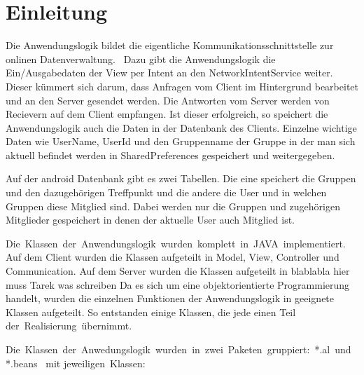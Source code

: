 \section{Einleitung}

Die Anwendungslogik bildet die eigentliche Kommunikationsschnittstelle zur onlinen
Datenverwaltung. 
Dazu gibt die Anwendungslogik die Ein­/Ausgabedaten der View per Intent
an den NetworkIntentService weiter. Dieser kümmert sich darum, dass Anfragen vom Client
im Hintergrund bearbeitet und an den Server gesendet werden. Die Antworten vom Server
werden von Recievern auf dem Client empfangen. Ist dieser erfolgreich,
so speichert die Anwendungslogik auch die Daten in der Datenbank des Clients. Einzelne wichtige
Daten wie UserName, UserId und den Gruppenname der Gruppe in der man sich aktuell befindet werden
in SharedPreferences gespeichert und weitergegeben.

Auf der android Datenbank gibt es zwei Tabellen. Die eine speichert die Gruppen und den dazugehörigen
Treffpunkt und die andere die User und in welchen Gruppen diese Mitglied sind. Dabei werden nur die
Gruppen und zugehörigen Mitglieder gespeichert in denen der aktuelle User auch Mitglied ist.

Die Klassen der Anwendungslogik wurden komplett in JAVA implementiert.
Auf dem Client wurden die Klassen aufgeteilt in Model, View, Controller und Communication.
Auf dem Server wurden die Klassen aufgeteilt in blablabla hier muss Tarek was schreiben
Da es sich um eine objektorientierte Programmierung handelt, wurden die einzelnen Funktionen der
Anwendungslogik in geeignete Klassen aufgeteilt. So entstanden einige Klassen, die jede einen Teil
der Realisierung übernimmt.


Die Klassen der Anwedungslogik wurden in zwei Paketen gruppiert: *.al und *.beans  mit
jeweiligen Klassen: